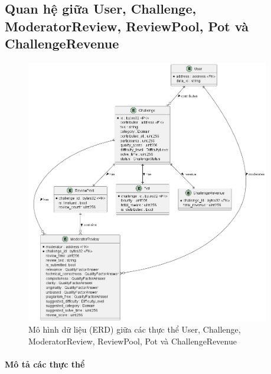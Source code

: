 \subsection{Quan hệ giữa User, Challenge, ModeratorReview, ReviewPool, Pot và ChallengeRevenue}
  \begin{figure}[H]
    \centering
    \includegraphics[width=0.95\textwidth]{../images/ERD-sub1.png}
    \caption{Mô hình dữ liệu (ERD) giữa các thực thể User, Challenge, ModeratorReview, ReviewPool, Pot và ChallengeRevenue}
    \label{fig:erd-sub1}
  \end{figure}

  \paragraph{Mô tả các thực thể}

